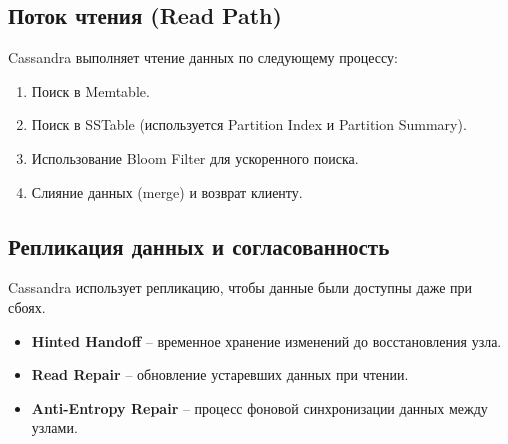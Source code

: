 \documentclass[a4paper,12pt]{article}
\begin{document}
\subsection{Поток чтения (Read Path)}
Cassandra выполняет чтение данных по следующему процессу:
\begin{enumerate}
    \item Поиск в Memtable.
    \item Поиск в SSTable (используется Partition Index и Partition Summary).
    \item Использование Bloom Filter для ускоренного поиска.
    \item Слияние данных (merge) и возврат клиенту.
\end{enumerate}

\subsection{Репликация данных и согласованность}
Cassandra использует репликацию, чтобы данные были доступны даже при сбоях.
\begin{itemize}
    \item \textbf{Hinted Handoff} – временное хранение изменений до восстановления узла.
    \item \textbf{Read Repair} – обновление устаревших данных при чтении.
    \item \textbf{Anti-Entropy Repair} – процесс фоновой синхронизации данных между узлами.
\end{itemize}
\end{document}
